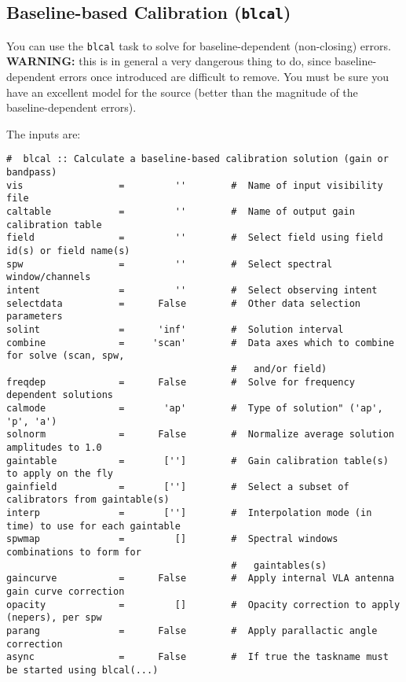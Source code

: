 \subsection{Baseline-based Calibration ({\tt blcal})}
\label{section:cal.solve.blcal}

You can use the {\tt blcal} task to solve for baseline-dependent
(non-closing) errors.  {\bf WARNING:} this is in general a very dangerous
thing to do, since baseline-dependent errors once introduced are
difficult to remove.  You must be sure you have an excellent model
for the source (better than the magnitude of the baseline-dependent
errors).

The inputs are:
\small
\begin{verbatim}
#  blcal :: Calculate a baseline-based calibration solution (gain or bandpass)
vis                 =         ''        #  Name of input visibility file
caltable            =         ''        #  Name of output gain calibration table
field               =         ''        #  Select field using field id(s) or field name(s)
spw                 =         ''        #  Select spectral window/channels
intent              =         ''        #  Select observing intent
selectdata          =      False        #  Other data selection parameters
solint              =      'inf'        #  Solution interval
combine             =     'scan'        #  Data axes which to combine for solve (scan, spw,
                                        #   and/or field)
freqdep             =      False        #  Solve for frequency dependent solutions
calmode             =       'ap'        #  Type of solution" ('ap', 'p', 'a')
solnorm             =      False        #  Normalize average solution amplitudes to 1.0
gaintable           =       ['']        #  Gain calibration table(s) to apply on the fly
gainfield           =       ['']        #  Select a subset of calibrators from gaintable(s)
interp              =       ['']        #  Interpolation mode (in time) to use for each gaintable
spwmap              =         []        #  Spectral windows combinations to form for
                                        #   gaintables(s)
gaincurve           =      False        #  Apply internal VLA antenna gain curve correction
opacity             =         []        #  Opacity correction to apply (nepers), per spw
parang              =      False        #  Apply parallactic angle correction
async               =      False        #  If true the taskname must be started using blcal(...)

\end{verbatim}
\normalsize


